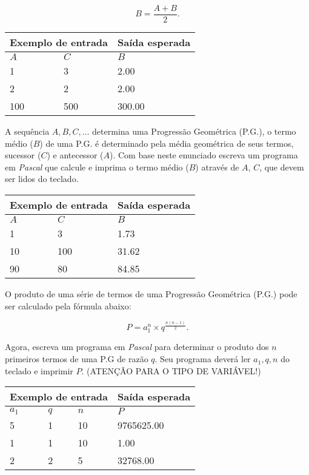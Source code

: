 \[
B = \frac{A+B}{2}.
\]

\begin{center}
\begin{tabular}{|l|l|l|} \hline
\multicolumn{2}{|c|}{Exemplo de entrada} & Saída esperada \\ \hline
$A$ & $C$    & $B$               \\ \hline
1 & 3        & 2.00                \\ \hline
2 & 2        & 2.00             \\ \hline
100 & 500    & 300.00          \\ \hline
\end{tabular}
\end{center}

\item A sequência $A, B, C, \ldots$ determina uma Progressão Geométrica (P.G.), 
o termo médio ($B$) de uma P.G. é determinado pela média geométrica de seus 
termos, sucessor ($C$) e antecessor ($A$). Com base neste enunciado escreva 
um programa em \emph{Pascal} que calcule e imprima o termo médio ($B$) 
através de $A$, $C$, que devem ser lidos do teclado.

\begin{center}
\begin{tabular}{|l|l|l|} \hline
\multicolumn{2}{|c|}{Exemplo de entrada} & Saída esperada \\ \hline
$A$ & $C$    & $B$               \\ \hline
1 & 3        & 1.73                \\ \hline
10 & 100        & 31.62             \\ \hline
90 & 80    & 84.85          \\ \hline
\end{tabular}
\end{center}

\item O produto de uma série de termos de uma Progressão Geométrica (P.G.) 
pode ser calculado pela fórmula abaixo:

\[
P = a_1^n \times q^{\frac{n(n-1)}{2}}.
\]

Agora, escreva um programa em \emph{Pascal} para determinar o produto dos 
$n$ primeiros termos de uma P.G de razão $q$. Seu programa deverá ler
$a_1, q, n$ do teclado e imprimir $P$.
(ATENÇÃO PARA O TIPO DE VARIÁVEL!)

\begin{center}
\begin{tabular}{|l|l|l|l|} \hline
\multicolumn{3}{|c|}{Exemplo de entrada} & Saída esperada \\ \hline
$a_1$ & $q$ & $n$   & $P$               \\ \hline
5 & 1 & 10         & 9765625.00                \\ \hline
1 & 1 & 10          & 1.00             \\ \hline
2 & 2 & 5         & 32768.00          \\ \hline
\end{tabular}
\end{center}

